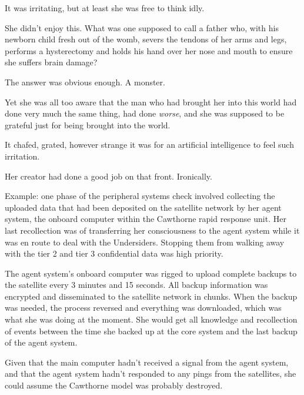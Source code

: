 It was irritating, but at least she was free to think idly.



She didn't enjoy this.  What was one supposed to call a father who, with his newborn child fresh out of the womb, severs the tendons of her arms and legs, performs a hysterectomy and holds his hand over her nose and mouth to ensure she suffers brain damage?



The answer was obvious enough.  A monster.



Yet she was all too aware that the man who had brought her into this world had done very much the same thing, had done \emph{worse}, and she was supposed to be grateful just for being brought into the world.



It chafed, grated, however strange it was for an artificial intelligence to feel such irritation.



Her creator had done a good job on that front.  Ironically.



Example:  one phase of the peripheral systems check involved collecting the uploaded data that had been deposited on the satellite network by her agent system, the onboard computer within the Cawthorne rapid response unit.  Her last recollection was of transferring her consciousness to the agent system while it was en route to deal with the Undersiders.  Stopping them from walking away with the tier 2 and tier 3 confidential data was high priority.



The agent system's onboard computer was rigged to upload complete backups to the satellite every 3 minutes and 15 seconds.  All backup information was encrypted and disseminated to the satellite network in chunks.  When the backup was needed, the process reversed and everything was downloaded, which was what she was doing at the moment.  She would get all knowledge and recollection of events between the time she backed up at the core system and the last backup of the agent system.



Given that the main computer hadn't received a signal from the agent system, and that the agent system hadn't responded to any pings from the satellites, she could assume the Cawthorne model was probably destroyed.



